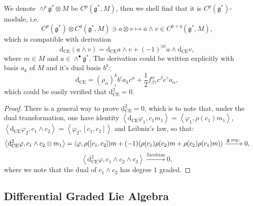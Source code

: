 \documentclass[10pt]{article}
\begin{document}
We denote $\wedge^{p} \mathfrak{g}^{*} \otimes M$ be $ C^{p}(\mathfrak{g}^{*}, M)$, then we shell find that it is $ C^{p}(\mathfrak{g}^{*})$-module, i.e.
\begin{equation*}
  C^{p}(\mathfrak{g}^{*}) \otimes C^{q}(\mathfrak{g}^{*}, M) \ni a \otimes v \mapsto a \wedge v \in C^{p+q}(\mathfrak{g}^{*}, M),
\end{equation*}
which is compatible with derivation
\begin{equation*}
  \mathrm{d} _{\mathrm{CE}} (a\wedge v) = \mathrm{d} _{\mathrm{CE}} a \wedge v + (-1)^{\left| a \right|} a \wedge \mathrm{d} _{\mathrm{CE}} v,
\end{equation*}
where $ m \in M$ and $ a \in \wedge^{\bullet} \mathfrak{g}^{*}$. The derivation could be written explicitly with basis $ a_{k}$ of $ M$ and it's dual basis $ b^{k}$:
\begin{equation*}
  \mathrm{d} _{\mathrm{CE}} = \left( \rho_{\alpha} \right)^{k}_{i} b^{i} a_{k} c^{\alpha} + \frac{1}{2} f^{\alpha}_{\beta \gamma} c^{\beta} c^{\gamma} a_{\alpha},
\end{equation*}
which could be easily verified that $ \mathrm{d} ^{2}_{\mathrm{CE}} = 0$.
\begin{proof}
  There is a general way to prove $ \mathrm{d} _{\mathrm{CE}}^{2} = 0$, which is to note that, under the dual transformation, one have identity $\left< \mathrm{d} _{\mathrm{CE}} \varphi_1 , c_1 m_1 \right> = \left< \varphi_1, \rho(c_1) m_1 \right>$, $\left< \mathrm{d} _{\mathrm{CE}} \varphi_2, c_{1}\wedge c_{2} \right> = \left< \varphi_2, [c_1, c_2] \right>$ and Leibniz's law, so that:
  \begin{equation*}
    \left< \mathrm{d} ^{2}_{\mathrm{CE}} \varphi, c_1 \wedge c_2 \otimes m_1 \right> = \left< \varphi , \rho([c_1, c_2]) m + (-1)( \rho(c_1) \rho(c_2) m + \rho(c_2) \rho(c_1) m ) \right> \xrightarrow{\text{$ \mathfrak{g}$ rep.}} 0,
  \end{equation*}
  \begin{equation*}
    \left< \mathrm{d} ^{2}_{\mathrm{CE}} \varphi, c_1 \wedge c_2 \wedge c_3 \right> \xrightarrow{\text{Jacobian}} 0,
  \end{equation*}
  where we note that the dual of $ c_1 \wedge c_2$ has degree $ 1$ graded.
\end{proof}

\subsection{Differential Graded Lie Algebra}
\end{document}
